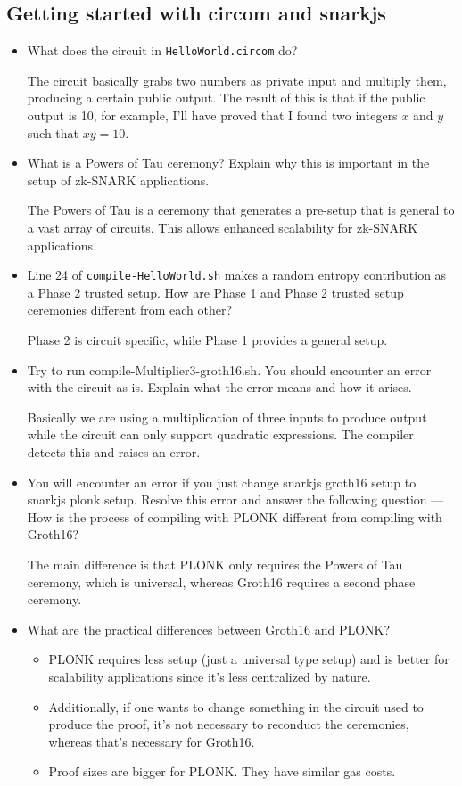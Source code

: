 \documentclass{article}
\begin{document}
\subsection*{Getting started with circom and snarkjs}
\begin{itemize}
    \item What does the circuit in \texttt{HelloWorld.circom} do? \par The circuit basically grabs two numbers as private input and multiply them, producing a certain public output. The result of this is that if the public output is 10, for example, I'll have proved that I found two integers $x$ and $y$ such that $xy = 10$.
    \item What is a Powers of Tau ceremony? Explain why this is important in the setup of zk-SNARK applications. \par The Powers of Tau is a ceremony that generates a pre-setup that is general to a vast array of circuits. This allows enhanced scalability for zk-SNARK applications.
    \item Line 24 of \texttt{compile-HelloWorld.sh} makes a random entropy contribution as a Phase 2 trusted setup. How are Phase 1 and Phase 2 trusted setup ceremonies different from each other? \par Phase 2 is circuit specific, while Phase 1 provides a general setup.
    \item Try to run compile-Multiplier3-groth16.sh. You should encounter an error with the circuit as is. Explain what the error means and how it arises. \par Basically we are using a multiplication of three inputs to produce output while the circuit can only support quadratic expressions. The compiler detects this and raises an error.
    \item You will encounter an error if you just change snarkjs groth16 setup to snarkjs plonk setup. Resolve this error and answer the following question --- How is the process of compiling with PLONK different from compiling with Groth16? \par The main difference is that PLONK only requires the Powers of Tau ceremony, which is universal, whereas Groth16 requires a second phase ceremony.
    \item What are the practical differences between Groth16 and PLONK?
    \begin{itemize}
        \item PLONK requires less setup (just a universal type setup) and is better for scalability applications since it's less centralized by nature.
        \item Additionally, if one wants to change something in the circuit used to produce the proof, it's not necessary to reconduct the ceremonies, whereas that's necessary for Groth16.
        \item Proof sizes are bigger for PLONK. They have similar gas costs.
    \end{itemize}
\end{itemize}
\end{document}

